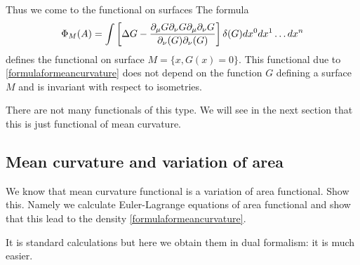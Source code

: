 \documentclass[12pt]{article}
\theoremstyle{theorem}
\begin{document}
Thus we come to the functional on surfaces
The formula
\begin{equation}\label{meancurvaturefunctional}
\Phi_M(A)=\int \left
[\Delta G-{\partial_\mu G\partial_\nu G \partial_\mu\partial_\nu G\over \partial_\nu (G)\partial_\nu (G)}
        \right]\delta(G)dx^0 dx^1\dots dx^n
\end{equation}
defines the functional on surface
                  $M=\{x, G(x)=0\}$.
                  This functional due to
\eqref{formulaformeancurvature} does not depend on the function $G$
defining a surface $M$ and is invariant with respect to isometries.

There are not many functionals of this type.
We will see in the next section that
this is just functional of mean curvature.

\subsection {Mean curvature and variation of area}

We know that mean curvature functional is a
variation of area functional.
Show this. Namely we calculate Euler-Lagrange equations of area functional
and show that this lead to the density \eqref{formulaformeancurvature}.

It is standard calculations but here we obtain them in dual formalism:
it is much easier.
\end{document}
